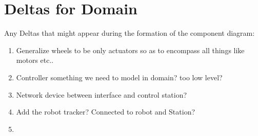 
\section{Deltas for Domain}
Any Deltas that might appear during the formation of the component diagram:

\begin{enumerate}
    \item Generalize wheels to be only actuators so as to encompass all things like motors etc..
    \item Controller something we need to model in domain? too low level?
    \item Network device between interface and control station?
    \item Add the robot tracker? Connected to robot and Station?
    \item 
\end{enumerate}
    